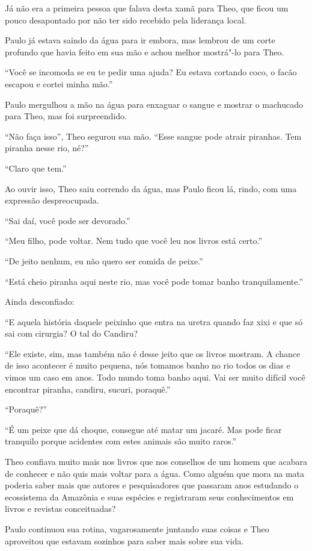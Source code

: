 Já não era a primeira pessoa que falava desta xamã para Theo, que ficou
um pouco desapontado por não ter sido recebido pela liderança local.

Paulo já estava saindo da água para ir embora, mas lembrou de um corte
profundo que havia feito em sua mão e achou melhor mostrá"-lo para Theo.

``Você se incomoda se eu te pedir uma ajuda? Eu estava cortando coco, o
facão escapou e cortei minha mão.''

Paulo mergulhou a mão na água para enxaguar o sangue e mostrar o
machucado para Theo, mas foi surpreendido.

``Não faça isso'', Theo segurou sua mão. ``Esse sangue pode atrair
piranhas. Tem piranha nesse rio, né?''

``Claro que tem.''

Ao ouvir isso, Theo saiu correndo da água, mas Paulo ficou lá, rindo,
com uma expressão despreocupada.

``Sai daí, você pode ser devorado.''

``Meu filho, pode voltar. Nem tudo que você leu nos livros está certo.''

``De jeito nenhum, eu não quero ser comida de peixe.''

``Está cheio piranha aqui neste rio, mas você pode tomar banho
tranquilamente.''

Ainda desconfiado:

``E aquela história daquele peixinho que entra na uretra quando faz xixi
e que só sai com cirurgia? O tal do Candiru?

``Ele existe, sim, mas também não é desse jeito que os livros mostram. A
chance de isso acontecer é muito pequena, nós tomamos banho no rio todos
os dias e vimos um caso em anos. Todo mundo toma banho aqui. Vai ser
muito difícil você encontrar piranha, candiru, sucuri, poraquê.''

``Poraquê?''

``É um peixe que dá choque, consegue até matar um jacaré. Mas pode ficar
tranquilo porque acidentes com estes animais são muito raros.''

Theo confiava muito mais nos livros que nos conselhos de um homem que
acabara de conhecer e não quis mais voltar para a água. Como alguém que
mora na mata poderia saber mais que autores e pesquisadores que passaram
anos estudando o ecossistema da Amazônia e suas espécies e registraram
seus conhecimentos em livros e revistas conceituadas?

Paulo continuou sua rotina, vagarosamente juntando suas coisas e Theo
aproveitou que estavam sozinhos para saber mais sobre sua vida.

